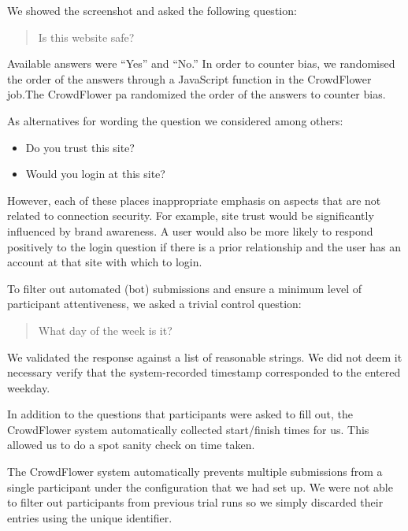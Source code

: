 \documentclass[twoside,letterpaper]{soups}
\begin{document}
We showed the screenshot and asked the following question:

\begin{quote}
Is this website safe?
\end{quote}

Available answers were ``Yes'' and ``No.'' In order to counter bias, we randomised the order of the answers through a JavaScript function in the CrowdFlower job.The CrowdFlower pa randomized the order of the answers to counter bias. %


As alternatives for wording the question we considered among others:

\begin{itemize}
\item Do you trust this site?
\item Would you login at this site?
\end{itemize}

However, each of these places inappropriate emphasis on aspects that are not related to connection security. For example, site trust would be significantly influenced by brand awareness. A user would also be more likely to respond positively to the login question if there is a prior relationship and the user has an account at that site with which to login.


To filter out automated (bot) submissions and ensure a minimum level of participant attentiveness, we asked a trivial control question:

\begin{quote}
What day of the week is it?
\end{quote}

We validated the response against a list of reasonable strings. We did not deem it necessary verify that the system-recorded timestamp corresponded to the entered weekday.

In addition to the questions that participants were asked to fill out, the CrowdFlower system automatically collected start/finish times for us. This allowed us to do a spot sanity check on time taken.

The CrowdFlower system automatically prevents multiple submissions from a single participant under the configuration that we had set up. We were not able to filter out participants from previous trial runs so we simply discarded their entries using the unique identifier. %
\end{document}
